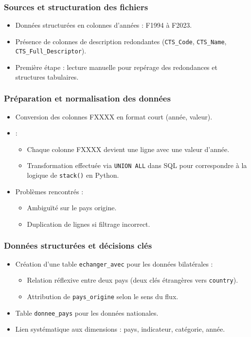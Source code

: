 \documentclass[11pt]{beamer}
\begin{document}
\begin{frame}
  \frametitle{Sources et structuration des fichiers}
  \begin{itemize}
    \item<1-> Données structurées en colonnes d'années : F1994 à F2023.
    \item<2-> Présence de colonnes de description redondantes (\texttt{CTS\_Code}, \texttt{CTS\_Name}, \texttt{CTS\_Full\_Descriptor}).
    \item<3-> Première étape : lecture manuelle pour repérage des redondances et structures tabulaires.
  \end{itemize}
\end{frame}

\begin{frame}
  \frametitle{Préparation et normalisation des données}
  \begin{itemize}
    \item<1-> Conversion des colonnes FXXXX en format court (année, valeur).
    \item<2->  :
    \begin{itemize}
      \item Chaque colonne FXXXX devient une ligne avec une valeur d'année.
      \item Transformation effectuée via \texttt{UNION ALL} dans SQL pour correspondre à la logique de \texttt{stack()} en Python.
    \end{itemize}
    \item<3-> Problèmes rencontrés :
    \begin{itemize}
      \item Ambiguïté sur le pays origine.
      \item Duplication de lignes si filtrage incorrect.
    \end{itemize}
  \end{itemize}
\end{frame}

\begin{frame}
  \frametitle{Données structurées et décisions clés}
  \begin{itemize}
    \item<1-> Création d'une table \texttt{echanger\_avec} pour les données bilatérales :
    \begin{itemize}
      \item Relation réflexive entre deux pays (deux clés étrangères vers \texttt{country}).
      \item Attribution de \texttt{pays\_origine} selon le sens du flux.
    \end{itemize}
    \item<2-> Table \texttt{donnee\_pays} pour les données nationales.
    \item<3-> Lien systématique aux dimensions : pays, indicateur, catégorie, année.
  \end{itemize}
\end{frame}
\end{document}
